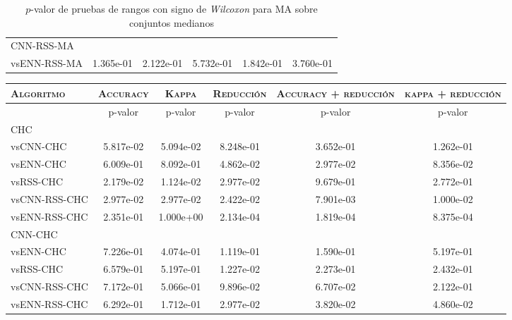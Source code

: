 \begin{table}[h!]
\begin{adjustbox}{max width =\textwidth}
\begin{tabular}{l c c c c c}
\hline

CNN-RSS-MA\\
vsENN-RSS-MA  & 1.365e-01 & 2.122e-01 & 5.732e-01 & 1.842e-01 & 3.760e-01 \\ 

\hline

\end{tabular}
\end{adjustbox}
\caption[Pruebas de \emph{Wilcoxon} entre MA y variaciones para conjuntos medianos]{$p$-valor de pruebas de rangos con signo de \emph{Wilcoxon} para MA sobre conjuntos medianos}
\label{wilcox-MA-med}
\end{table}

\begin{table}[h!]
\centering
\begin{adjustbox}{max width =\textwidth}
\begin{tabular}{l c c c c c}
\hline
	\textsc{Algoritmo}
	& \multicolumn{1}{c}{\textsc{Accuracy}}
	& \multicolumn{1}{c}{\textsc{Kappa}}
	& \multicolumn{1}{c}{\textsc{Reducción}} 
	& \multicolumn{1}{c}{\textsc{Accuracy + reducción}} 
	& \multicolumn{1}{c}{\textsc{kappa + reducción}} \\

\hline
\hline

 & p-valor & p-valor & p-valor & p-valor & p-valor \\

CHC\\
vsCNN-CHC     & 5.817e-02 & 5.094e-02 & 8.248e-01 & 3.652e-01 & 1.262e-01 \\ 
vsENN-CHC     & 6.009e-01 & 8.092e-01 & 4.862e-02 & 2.977e-02 & 8.356e-02 \\ 
vsRSS-CHC     & 2.179e-02 & 1.124e-02 & 2.977e-02 & 9.679e-01 & 2.772e-01 \\ 
vsCNN-RSS-CHC & 2.977e-02 & 2.977e-02 & 2.422e-02 & 7.901e-03 & 1.000e-02 \\ 
vsENN-RSS-CHC & 2.351e-01 & 1.000e+00 & 2.134e-04 & 1.819e-04 & 8.375e-04 \\  

\hline

CNN-CHC\\
vsENN-CHC & 7.226e-01 & 4.074e-01 & 1.119e-01 & 1.590e-01 & 5.197e-01 \\
vsRSS-CHC & 6.579e-01 & 5.197e-01 & 1.227e-02 & 2.273e-01 & 2.432e-01 \\
vsCNN-RSS-CHC & 7.172e-01 & 5.066e-01 & 9.896e-02 & 6.707e-02 & 2.122e-01 \\ 
vsENN-RSS-CHC  & 6.292e-01 & 1.712e-01 & 2.977e-02 & 3.820e-02 & 4.860e-02 \\


\end{tabular}
\end{adjustbox}
\end{table}
